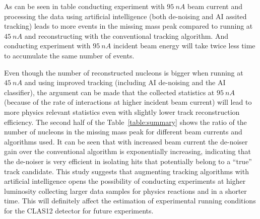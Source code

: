 As can be seen in table conducting experiment with $95~nA$ beam current and processing the data using artificial 
intelligence (both de-noising and AI assited tracking) leads to more events in the missing 
mass peak compared to running at $45~nA$ and reconstructing with the conventional tracking algorithm. And conducting
experiment with $95~nA$ incident beam energy will take twice less time to accumulate the same number of events.

Even though the number of reconstructed nucleons is bigger when running at $45~nA$ and using improved 
tracking (including AI de-noising and the AI classifier), the argument can be made that the collected statistics at 
$95~nA$ (because of the rate of interactions at higher incident beam current) will lead to more physics relevant
statistics even with slightly lower track reconstruction efficiency.
The second half of the Table~\ref{table:summary} shows the ratio of the number of nucleons in the 
missing mass peak for different beam currents and algorithms used. It can be seen that with increased 
beam current the de-noiser gain over the conventional algorithm is exponentially increasing, indicating that 
the de-noiser is very efficient in isolating hits that potentially belong to a ``true'' track candidate.
This study suggests that augmenting tracking algorithms with artificial intelligence opens the possibility
of conducting experiments at higher luminosity collecting larger data samples for physics reactions and in 
a shorter time. This will definitely affect the estimation of experimental running conditions for the CLAS12 
detector for future experiments.
